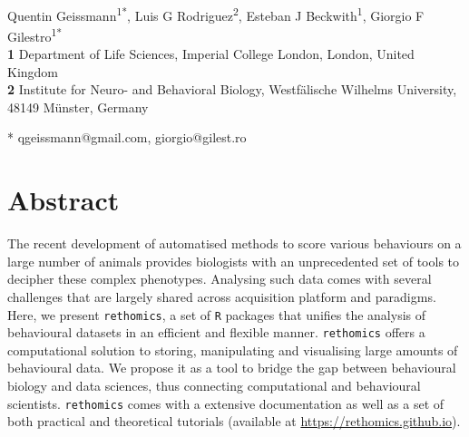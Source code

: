 \documentclass[10pt,letterpaper]{article}\usepackage[]{graphicx}\usepackage[]{color}
\date{}
\begin{document}
\vspace*{0.2in}

\begin{flushleft}
{\Large
\textbf{} 
}
\newline
\\
Quentin Geissmann\textsuperscript{1*},
Luis G Rodriguez\textsuperscript{2},
Esteban J Beckwith\textsuperscript{1},
Giorgio F Gilestro\textsuperscript{1*}
\\
\bigskip
\textbf{1} Department of Life Sciences, Imperial College London, London, United Kingdom
\\
\textbf{2} Institute for Neuro- and Behavioral Biology, Westf{\"a}lische Wilhelms University, 48149 M{\"u}nster, Germany
\\
\bigskip


* qgeissmann@gmail.com, giorgio@gilest.ro

\end{flushleft}
\section*{Abstract}
The recent development of automatised methods to score various behaviours on a large number of animals
provides biologists with an unprecedented set of tools to decipher these complex phenotypes. 
Analysing such data comes with several challenges that are largely shared across acquisition platform and paradigms.
Here, we present \texttt{rethomics}, a set of \texttt{R} packages that unifies the analysis of behavioural datasets in an efficient and flexible manner.
\texttt{rethomics} offers a computational solution to storing, manipulating and visualising large amounts of behavioural data.
We propose it as a tool to bridge the gap between behavioural biology and data sciences, thus connecting computational and behavioural scientists.
\texttt{rethomics} comes with a extensive documentation as well as a set of both practical and theoretical tutorials (available at \href{https://rethomics.github.io}{https://rethomics.github.io}).
\end{document}
